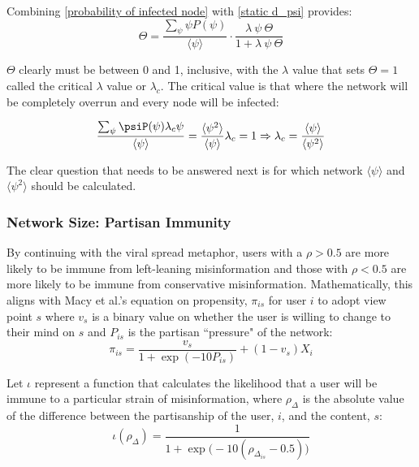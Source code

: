 \documentclass[preprint,review,12pt]{elsarticle}
\begin{document}
Combining \ref{probability of infected node} with \ref{static d_psi} provides:
\begin{equation}
    \Theta =  \frac{\sum_{\psi} \psi P(\psi)}{\langle \psi \rangle}\cdot \frac{\lambda \ \psi \ \Theta}{1 + \lambda \ \psi \ \Theta}
\end{equation}

$\Theta$ clearly must be between 0 and 1, inclusive, with the $\lambda$ value that sets $\Theta = 1$ called the critical $\lambda$ value or $\lambda_c$. The critical value is that where the network will be completely overrun and every node will be infected: 

\begin{equation}
\label{critical value equation}
    \frac{\sum_{\psi} \psiP(\psi)\lambda_c\psi}{\langle \psi \rangle} = \frac{\langle \psi^2 \rangle}{\langle \psi \rangle}\lambda_c = 1 \Rightarrow \lambda_c = \frac{\langle \psi \rangle}{\langle \psi^2 \rangle}
\end{equation}

The clear question that needs to be answered next is for which network $\langle \psi \rangle$ and $\langle \psi^2 \rangle$ should be calculated. 

\subsubsection{Network Size: Partisan Immunity}
By continuing with the viral spread metaphor, users with a $\rho > 0.5$ are more likely to be immune from left-leaning misinformation and those with  $\rho < 0.5$ are more likely to be immune from conservative misinformation. Mathematically, this aligns with Macy et al.'s equation on propensity, $\pi_{is}$ for user $i$ to adopt view point $s$ where $v_s$ is a binary value on whether the user is willing to change to their mind on $s$ and $P_{is}$ is the partisan ``pressure" of the network:
\begin{equation}
\label{propensity}
    \pi_{is}=\frac{v_s}{1+\exp{(-10P_{is})}}+(1-v_{s})X_i
\end{equation}

Let $\iota$ represent a function that calculates the likelihood that a user will be immune to a particular strain of misinformation, where $\rho_{\Delta}$ is the absolute value of the difference between the partisanship of the user, $i$, and the content, $s$:
\begin{equation}
\label{immunity equation}
    \iota(\rho_{\Delta})=\frac{1}{1+\exp{\big(-10 (\rho_{\Delta_{is}}-0.5)\big)}}
\end{equation}
\end{document}
